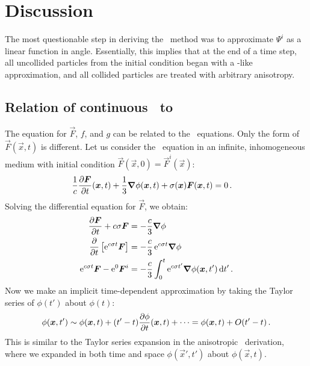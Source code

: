\section{Discussion}

The most questionable step in deriving the \APone\ method was to approximate
$\Psi^i$ as a linear function in angle. Essentially, this implies that at the
end of a time step, all uncollided particles from the initial condition began
with a \Pone-like approximation, and all collided particles are treated with
arbitrary anisotropy.

\subsection[Relation of continuous AP1 to P1]{Relation of continuous \APone\ to \Pone}

The equation for $\vec{F}$, $f$, and $g$ can be related to the \Pone\
equations. Only the form of $\vec{F}(\vec{x},t)$ is different. Let us consider
the \Pone\ equation in an infinite, inhomogeneous medium with initial
condition $\vec{F}(\vec{x},0) = \vec{F}^i(\vec{x})$:
\begin{align*}
  \frac{1}{c}\frac{\partial \bm{F}}{\partial t}(\bm{x},t) + \frac13 \bm{\nabla} \phi(\bm{x},t) +
  \sigma(\bm{x}) \bm{F}(\bm{x},t) &= 0 \,.
\end{align*}
Solving the differential equation for $\vec{F}$, we obtain:
\begin{align*}
  \frac{\partial \bm{F}}{\partial t} +  c\sigma \bm{F} &= - \frac{c}{3} \bm{\nabla} \phi
  \\
  \frac{\partial }{\partial t}\left[ \mathop{}\!\mathrm{e}^{c \sigma t} \bm{F} \right]
  &= - \frac{c}{3} \mathop{}\!\mathrm{e}^{c \sigma t} \bm{\nabla} \phi
  \\
  \mathop{}\!\mathrm{e}^{c \sigma t} \bm{F} - \mathop{}\!\mathrm{e}^{0} \bm{F}^i
  &= - \frac{c}{3} \int_0^{t} \mathop{}\!\mathrm{e}^{c \sigma t'} \bm{\nabla} \phi(\bm{x}, t')
  \mathop{}\!\mathrm{d} t' \,.
\end{align*}
Now we make an implicit time-dependent approximation by taking the Taylor
series of $\phi(t')$ about $\phi(t)$:
\begin{equation*}
  \phi(\bm{x}, t') \sim \phi(\bm{x}, t) + (t' - t) \frac{\partial \phi}{\partial t}(\bm{x}, t)
  + \cdots
  = \phi(\bm{x}, t) + O(t' - t)\,.
\end{equation*}
This is similar to the Taylor series expansion in the anisotropic \Pone\ 
derivation, where we expanded in both time and space $\phi(\vec{x}', t')$ about
$\phi(\vec{x}, t)$.

